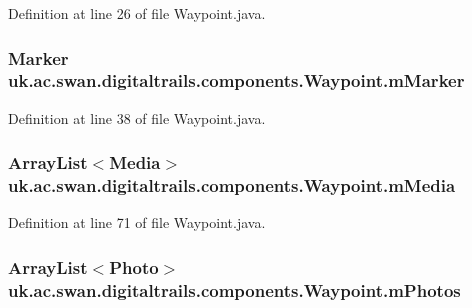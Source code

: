 Definition at line 26 of file Waypoint.\+java.

\hypertarget{classuk_1_1ac_1_1swan_1_1digitaltrails_1_1components_1_1_waypoint_a90232a0d2fec40f5ae645534db1ad847}{
\subsubsection[{m\+Marker}]{\setlength{\rightskip}{0pt plus 5cm}Marker uk.\+ac.\+swan.\+digitaltrails.\+components.\+Waypoint.\+m\+Marker\hspace{0.3cm}{\ttfamily [private]}}}\label{classuk_1_1ac_1_1swan_1_1digitaltrails_1_1components_1_1_waypoint_a90232a0d2fec40f5ae645534db1ad847}


Definition at line 38 of file Waypoint.\+java.

\hypertarget{classuk_1_1ac_1_1swan_1_1digitaltrails_1_1components_1_1_waypoint_adc0e8bc4e7814896a0f7521118d5b9fd}{
\subsubsection[{m\+Media}]{\setlength{\rightskip}{0pt plus 5cm}Array\+List$<${\bf Media}$>$ uk.\+ac.\+swan.\+digitaltrails.\+components.\+Waypoint.\+m\+Media\hspace{0.3cm}{\ttfamily [private]}}}\label{classuk_1_1ac_1_1swan_1_1digitaltrails_1_1components_1_1_waypoint_adc0e8bc4e7814896a0f7521118d5b9fd}


Definition at line 71 of file Waypoint.\+java.

\hypertarget{classuk_1_1ac_1_1swan_1_1digitaltrails_1_1components_1_1_waypoint_a2e68c6b5cb4a52d561f354960c188d9b}{
\subsubsection[{m\+Photos}]{\setlength{\rightskip}{0pt plus 5cm}Array\+List$<${\bf Photo}$>$ uk.\+ac.\+swan.\+digitaltrails.\+components.\+Waypoint.\+m\+Photos\hspace{0.3cm}{\ttfamily [private]}}}\label{classuk_1_1ac_1_1swan_1_1digitaltrails_1_1components_1_1_waypoint_a2e68c6b5cb4a52d561f354960c188d9b}


